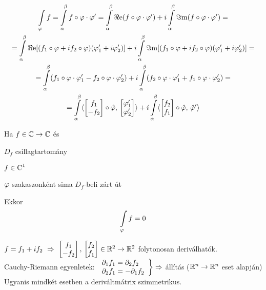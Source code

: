 \begin{biz}
  \begin{gather*}
    \di\Int_\vfi f = \Int_\alpha^\beta  f\circ \vfi \cdot \vfi' =\Int_\alpha^\beta \re( f\circ \vfi \cdot \vfi') +
    i \Int_\alpha^\beta  \im( f\circ \vfi \cdot \vfi') = \\=\Int_\alpha^\beta  \re[(f_1\circ \vfi + if_2\circ \vfi)
      (\vfi_1'+i\vfi_2')] + i\Int_\alpha^\beta  \im[(f_1\circ \vfi + if_2\circ \vfi) (\vfi_1'+i\vfi_2')] =\\
    =\Int_\alpha^\beta  (f_1\circ \vfi\cdot \vfi_1' - f_2\circ \vfi \cdot \vfi_2') 
    + i\Int_\alpha^\beta  (f_2\circ \vfi\cdot \vfi_1' + f_1\circ \vfi\cdot \vfi_2') = \\
    =  \Int_\alpha^\beta \skalar{ \begin{bmatrix} f_1\\-f_2\end{bmatrix} \circ  \hat\vfi}{\begin{bmatrix}
    \vfi_1'\\\vfi_2'\end{bmatrix}} + i\Int_\alpha^\beta \skalar{ \begin{bmatrix} f_2\\f_1\end{bmatrix} \circ
    \hat\vfi}{\hat\vfi'}    
  \end{gather*}
\end{biz}

\begin{te}
  Ha $f\in\mathbb{C}\to\mathbb{C}$ és
  \begin{enumzjr}
    \item $D_f$ csillagtartomány
    \item $f\in\operatorname{C}^1$
    \item $\varphi$ szakaszonként sima $D_f$-beli zárt út
  \end{enumzjr}
  Ekkor
  \[ \di\Int_\vfi f = 0\]
\end{te}

\begin{biz}
  $f=f_1 +if_2\ \nn\ \begin{bmatrix}f_1\\-f_2\end{bmatrix},\,\begin{bmatrix}f_2\\f_1\end{bmatrix}\in\R^2\to\R^2$
  folytonosan deriválhatók.\\
  Cauchy-Riemann egyenletek: $\left.\begin{array}{l}\partial_1f_1 =\partial_2f_2 \\ \partial_2f_1 = -\partial_1f_2
  \end{array}\right\}\Rightarrow$ állítás ($\mathbb{R}^n\to\mathbb{R}^n$ eset alapján)\\
  Ugyanis mindkét esetben a deriváltmátrix szimmetrikus.
\end{biz}

